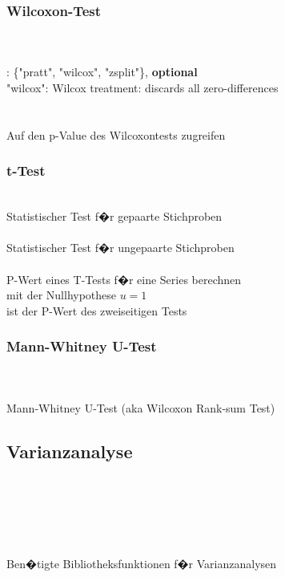 \documentclass{article}
\begin{document}
\begin{multicols*}{3}
\subsubsection*{Wilcoxon-Test}
\\
\vspace{0.5em}\\
 : \{"pratt", "wilcox", "zsplit"\}, \textbf{optional}\\
"wilcox": Wilcox treatment: discards all zero-differences
\vspace{0.5em}\\
\\
 \\
Auf den p-Value des Wilcoxontests zugreifen\\

\subsubsection*{t-Test}
 \\
Statistischer Test f�r gepaarte Stichproben  \\

 \\
Statistischer Test f�r ungepaarte Stichproben  \\

 \\
P-Wert eines T-Tests f�r eine Series berechnen \\
mit der Nullhypothese $u=1$ \\
\colorbox{red!20!white}{ ist der P-Wert des zweiseitigen Tests}\\

\subsubsection*{Mann-Whitney U-Test}
\\
 \\
Mann-Whitney U-Test (aka Wilcoxon Rank-sum Test) \\


\subsection*{Varianzanalyse}
 \\
 \\
 \\
 \\
 \\
Ben�tigte Bibliotheksfunktionen f�r Varianzanalysen


\end{multicols*}
\end{document}

